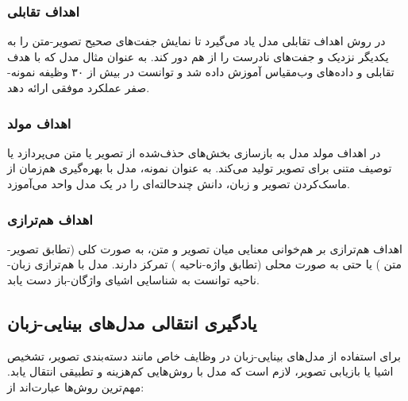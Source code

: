 \subsubsection{اهداف تقابلی}
در روش اهداف تقابلی 
مدل یاد می‌گیرد تا نمایش جفت‌های صحیح تصویر-متن را به یکدیگر نزدیک و جفت‌های نادرست را از هم دور کند. به عنوان مثال 
مدل 
 که با هدف تقابلی و داده‌های وب‌مقیاس آموزش داده شد و توانست در بیش از ۳۰ وظیفه نمونه-صفر عملکرد موفقی ارائه دهد.

\subsubsection{اهداف مولد}
در اهداف مولد
مدل به بازسازی بخش‌های حذف‌شده از تصویر یا متن می‌پردازد یا توصیف متنی برای تصویر تولید می‌کند. به عنوان نمونه، مدل
\cite{flava}
با بهره‌گیری هم‌زمان از ماسک‌کردن تصویر و زبان، دانش چندحالته‌ای را در یک مدل واحد می‌آموزد.

\subsubsection{اهداف هم‌ترازی}
اهداف هم‌ترازی
بر هم‌خوانی معنایی میان تصویر و متن،
به صورت کلی (تطابق تصویر-متن )
یا حتی به صورت محلی (تطابق واژه-ناحیه )
تمرکز دارند. مدل 
\cite{glip}
با هم‌ترازی زبان-ناحیه توانست به شناسایی اشیای واژگان-باز
دست یابد.

\subsection{یادگیری انتقالی مدل‌های بینایی-زبان}
برای استفاده از مدل‌های بینایی-زبان در وظایف خاص مانند دسته‌بندی تصویر، تشخیص اشیا یا بازیابی تصویر، لازم است که مدل با روش‌هایی کم‌هزینه و تطبیقی انتقال یابد. مهم‌ترین روش‌ها عبارت‌اند از:
